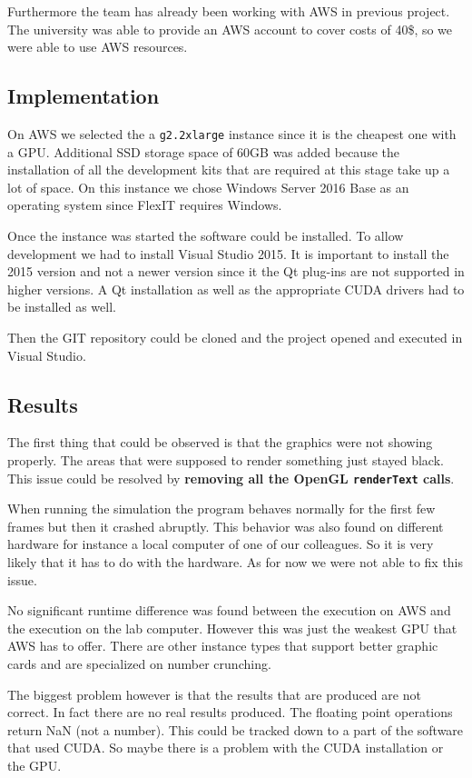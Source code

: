 \documentclass[a4paper, 11pt, article]{report}
\begin{document}
Furthermore the team has already been working with AWS in previous project. The university was able to provide an AWS account to cover costs of 40\$, so we were able to use AWS resources. 


\subsection{Implementation}

On AWS we selected the a \texttt{g2.2xlarge} instance since it is the cheapest one with a GPU. Additional SSD storage space of 60GB was added because the installation of all the development kits that are required at this stage take up a lot of space. On this instance we chose Windows Server 2016 Base as an operating system since FlexIT requires Windows. 

Once the instance was started the software could be installed. To allow development we had to install Visual Studio 2015. It is important to install the 2015 version and not a newer version since it the Qt plug-ins are not supported in higher versions. A Qt installation as well as the appropriate CUDA drivers had to be installed as well. 

Then the GIT repository could be cloned and the project opened and executed in Visual Studio. 

\subsection{Results}

The first thing that could be observed is that the graphics were not showing properly. The areas that were supposed to render something just stayed black. This issue could be resolved by \textbf{removing all the OpenGL \texttt{renderText} calls}. 

When running the simulation the program behaves normally for the first few frames but then it crashed abruptly. This behavior was also found on different hardware for instance a local computer of one of our colleagues. So it is very likely that it has to do with the hardware. As for now we were not able to fix this issue. 

No significant runtime difference was found between the execution on AWS and the execution on the lab computer. However this was just the weakest GPU that AWS has to offer. There are other instance types that support better graphic cards and are specialized on number crunching. 

The biggest problem however is that the results that are produced are not correct. In fact there are no real results produced. The floating point operations return NaN (not a number). This could be tracked down to a part of the software that used CUDA. So maybe there is a problem with the CUDA installation or the GPU. 
\end{document}

